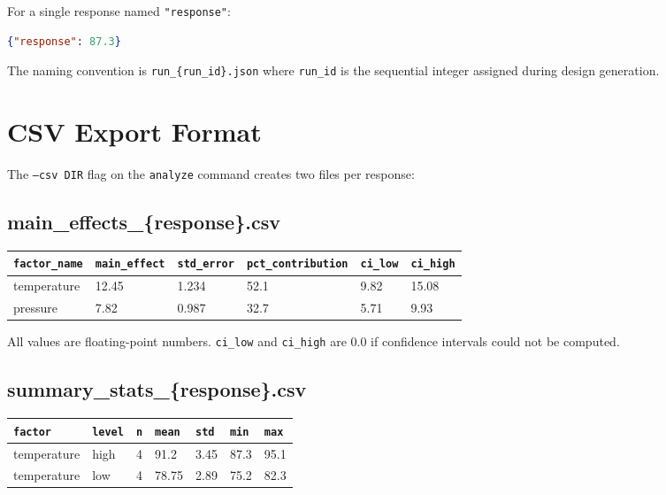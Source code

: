 \documentclass[11pt]{book}
\begin{document}
For a single response named \texttt{"response"}:

\begin{lstlisting}[language=json]
{"response": 87.3}
\end{lstlisting}

The naming convention is \texttt{run\_\{run\_id\}.json} where \texttt{run\_id} is the sequential integer assigned during design generation.

\section{CSV Export Format}

The \texttt{--csv DIR} flag on the \texttt{analyze} command creates two files per response:

\subsection{main\_effects\_\{response\}.csv}

\begin{table}[H]
\centering
\begin{tabular}{@{}llllll@{}}
\toprule
\texttt{factor\_name} & \texttt{main\_effect} & \texttt{std\_error} & \texttt{pct\_contribution} & \texttt{ci\_low} & \texttt{ci\_high} \\
\midrule
temperature & 12.45 & 1.234 & 52.1 & 9.82 & 15.08 \\
pressure & 7.82 & 0.987 & 32.7 & 5.71 & 9.93 \\
\bottomrule
\end{tabular}
\end{table}

All values are floating-point numbers. \texttt{ci\_low} and \texttt{ci\_high} are 0.0 if confidence intervals could not be computed.

\subsection{summary\_stats\_\{response\}.csv}

\begin{table}[H]
\centering
\begin{tabular}{@{}lllllll@{}}
\toprule
\texttt{factor} & \texttt{level} & \texttt{n} & \texttt{mean} & \texttt{std} & \texttt{min} & \texttt{max} \\
\midrule
temperature & high & 4 & 91.2 & 3.45 & 87.3 & 95.1 \\
temperature & low & 4 & 78.75 & 2.89 & 75.2 & 82.3 \\
\bottomrule
\end{tabular}
\end{table}
\end{document}
